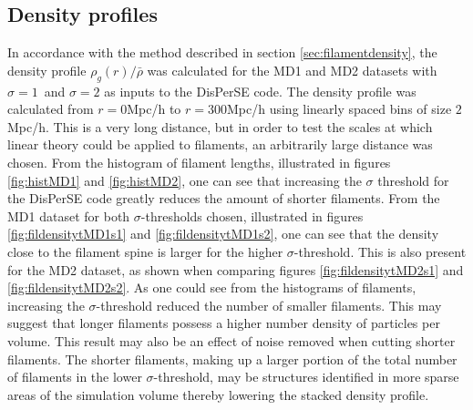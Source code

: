 \subsection{Density profiles}\label{sec:filamentdensityres}
In accordance with the method described in section \ref{sec:filamentdensity}, the density profile $\rho_g(r)/\bar{\rho}$ was calculated for the MD1 and MD2 datasets with $\sigma=1$ and $\sigma=2$ as inputs to the DisPerSE code. The density profile was calculated from $r=0$Mpc/h to $r=300$Mpc/h using linearly spaced bins of size $2$Mpc/h. This is a very long distance, but in order to test the scales at which linear theory could be applied to filaments, an arbitrarily large distance was chosen. From the histogram of filament lengths, illustrated in figures \ref{fig:histMD1} and \ref{fig:histMD2}, one can see that increasing the $\sigma$ threshold for the DisPerSE code greatly reduces the amount of shorter filaments. From the MD1 dataset for both $\sigma$-thresholds chosen, illustrated in figures \ref{fig:fildensitytMD1s1} and \ref{fig:fildensitytMD1s2}, one can see that the density close to the filament spine is larger for the higher $\sigma$-threshold. This is also present for the MD2 dataset, as shown when comparing figures \ref{fig:fildensitytMD2s1} and \ref{fig:fildensitytMD2s2}. As one could see from the histograms of filaments, increasing the $\sigma$-threshold reduced the number of smaller filaments. This may suggest that longer filaments possess a higher number density of particles per volume. This result may also be an effect of noise removed when cutting shorter filaments. The shorter filaments, making up a larger portion of the total number of filaments in the lower $\sigma$-threshold, may be structures identified in more sparse areas of the simulation volume thereby lowering the stacked density profile.\\\indent
